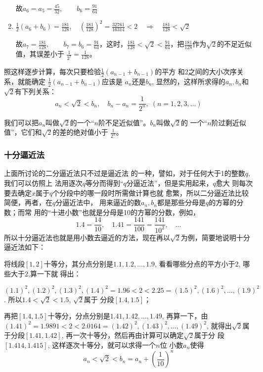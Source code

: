 \begin{enumerate}
     故$a_{6}=a_{5}=\frac{45}{32}, \qquad b_{6}=\frac{91}{64}
    $

    
    \item  $\frac{1}{2}\left(a_{6}+b_{6}\right)=\frac{181}{128},\quad \left(\frac{181}{128}\right)^{2}=\frac{32761}{16314}<2 \quad\Rightarrow\quad \frac{181}{128}<\sqrt{2}$
    
     故$a_{7}=\frac{181}{128}, \qquad b_{7}=b_{6}=\frac{91}{64}$，这时，$\frac{181}{128}<\sqrt{2}<\frac{91}{64}$，把$\frac{181}{128}$作为$\sqrt{2}$的不足近似值，其误差小于
$\frac{1}{2^7}=\frac{1}{128}$。
\end{enumerate}

照这样逐步计算，每次只要检验$\frac{1}{2}(a_{n-1}+b_{n-1})$的平方
和2之间的大小次序关系，就能确定
$\frac{1}{2}(a_{n-1}+b_{n-1})$应该是
$a_n$还是$b_n$, 显然的，这样所求得的$a_n,b_n$和$\sqrt{2}$有下列关系：
\[a_n<\sqrt{2}<b_n,\quad b_n-a_n=\frac{1}{2^n},\; (n=1,2,3,\ldots)\]

我们可以把$a_n$叫做$\sqrt{2}$的一个“$n$阶不足近似值”。$b_n$叫做$\sqrt{2}$的
一个“$n$阶过剩近似值”，它们和$\sqrt{2}$的差的绝对值小于
$\frac{1}{2^n}$。


\subsubsection{十分逼近法}

上面所讨论的二分逼近法只不过是逼近法
的一种，譬如，对于任何大于1的整数$q$, 我们可以仿照上
法用逐次$q$等分而得到“$q$分逼近法”，但是实用起来，$q$愈大
则每次要去确定$x$属于$q$个分段中的哪一段时所需做计算也就
愈繁，所以二分逼近法比较简便，再者，在$q$分逼近法中，
用来逼近的数$a_n,b_n$都是那些分母是$q$的方幂的分数；而常
用的“十进小数”也就是分母是10的方幂的分数，例如，
\[1.4=\frac{14}{10},\quad  1.41=\frac{141}{100}=\frac{141}{10^2},\quad \ldots \]
所以十分逼近法也就是用小数去逼近的方法，现在再以$\sqrt{2}$为例，简要地说明十分逼近法如下：

将线段$[1,2]$十等分，其分点分别是$1.1,1.2,\ldots,
1.9$, 看看哪些分点的平方小于2, 哪些大于2,算一下就
得出：

$(1.1)^2,(1.2)^2,(1.3)^2,(1.4)^2=1.96<2<2.25=
(1.5)^2,(1.6)^2,\ldots ,(1.9)^2$. 所以$1.4<\sqrt{2}<1.5$, $\sqrt{2}$属于
分段$[1.4,1.5]$；

再把$[1.4,1.5]$十等分，分点分别是$1.41,1.42,\ldots,
1.49$, 再算一下，由$(1.41)^2=1.9891<2<2.0164=
(1.42)^2,(1.43)^2,\ldots,(1.49)^2$, 就得出$\sqrt{2}$属于分段$[1.41,1.42]$, 再一次十等分，然后再由计算可以确定$\sqrt{2}$属于分
段$[1.414,1.415]$, 这样逐次十等分，就可以求得一个$n$位
小数$a_n$使得
\[a_n<\sqrt{2}<b_n=a_n+\left(\frac{1}{10}\right)^n\]

